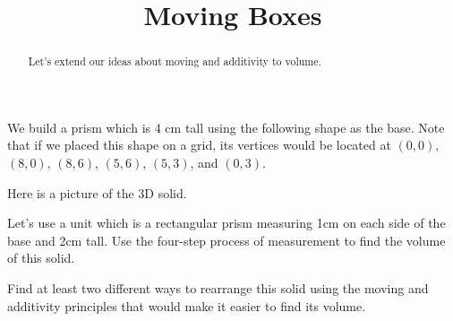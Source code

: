 \documentclass[noauthor,nooutcomes, handout]{ximera}
\begin{document}
\title{Moving Boxes}
\begin{abstract}
Let's extend our ideas about moving and additivity to volume.
\end{abstract}
\maketitle


\begin{problem}
We build a prism which is 4 cm tall using the following shape as the base. Note that if we placed this shape on a grid, its vertices would be located at $(0,0)$, $(8,0)$, $(8,6)$, $(5,6)$, $(5,3)$, and $(0,3)$.
\begin{center}
\end{center}
Here is a picture of the 3D solid.

\begin{center}
\end{center}
Let's use a unit which is a rectangular prism measuring 1cm on each side of the base and 2cm tall. Use the four-step process of measurement to find the volume of this solid.
\end{problem}


\begin{problem}
Find at least two different ways to rearrange this solid using the moving and additivity principles that would make it easier to find its volume.
\end{problem}
\end{document}
